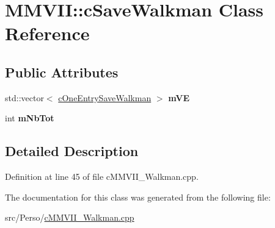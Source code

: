 \hypertarget{classMMVII_1_1cSaveWalkman}{}\section{M\+M\+V\+II\+:\+:c\+Save\+Walkman Class Reference}
\label{classMMVII_1_1cSaveWalkman}
\subsection*{Public Attributes}
\begin{DoxyCompactItemize}
\item 
std\+::vector$<$ \hyperlink{classMMVII_1_1cOneEntrySaveWalkman}{c\+One\+Entry\+Save\+Walkman} $>$ {\bfseries m\+VE}\hypertarget{classMMVII_1_1cSaveWalkman_ae91088e5fe03e79439df9a6fa24411a5}{}\label{classMMVII_1_1cSaveWalkman_ae91088e5fe03e79439df9a6fa24411a5}

\item 
int {\bfseries m\+Nb\+Tot}\hypertarget{classMMVII_1_1cSaveWalkman_a51df3d97ee82f692064ee2dc127d5a73}{}\label{classMMVII_1_1cSaveWalkman_a51df3d97ee82f692064ee2dc127d5a73}

\end{DoxyCompactItemize}


\subsection{Detailed Description}


Definition at line 45 of file c\+M\+M\+V\+I\+I\+\_\+\+Walkman.\+cpp.



The documentation for this class was generated from the following file\+:\begin{DoxyCompactItemize}
\item 
src/\+Perso/\hyperlink{cMMVII__Walkman_8cpp}{c\+M\+M\+V\+I\+I\+\_\+\+Walkman.\+cpp}\end{DoxyCompactItemize}

